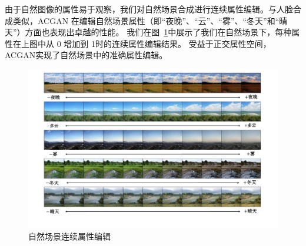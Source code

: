由于自然图像的属性易于观察，我们对自然场景合成进行连续属性编辑。与人脸合成类似，ACGAN 在编辑自然场景属性（即“夜晚”、“云”、“雾”、“冬天”和“晴天”）方面也表现出卓越的性能。 我们在图~\ref{fig:scene}中展示了我们在自然场景下，每种属性在上图中从 0 增加到 1时的连续属性编辑结果。 受益于正交属性空间，ACGAN实现了自然场景中的准确属性编辑。

\begin{figure}
    \begin{center}
         \includegraphics[width=0.85\linewidth]{figures/ACGAN/scene.pdf}
    \end{center}
    \caption{自然场景连续属性编辑}
    \label{fig:scene}
\end{figure}

